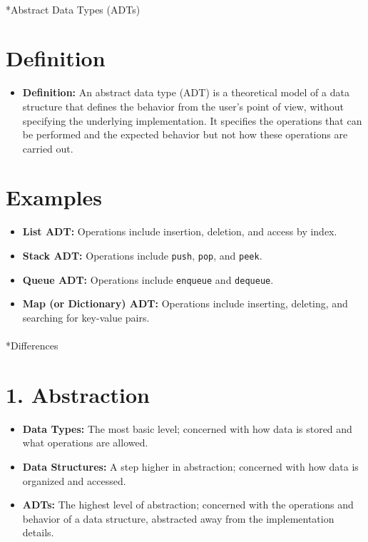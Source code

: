 \documentclass[
  letterpaper,
  DIV=11,
  numbers=noendperiod]{scrreprt}
\makeatletter
\let\oldparagraph\paragraph
\renewcommand{\paragraph}{
    \@ifstar
      \xxxParagraphStar
      \xxxParagraphNoStar
  }
\newcommand{\xxxParagraphStar}[1]{\oldparagraph*{#1}\mbox{}}
\newcommand{\xxxParagraphNoStar}[1]{\oldparagraph{#1}\mbox{}}
\providecommand{\tightlist}{%
  \setlength{\itemsep}{0pt}\setlength{\parskip}{0pt}}
\makeatother
\begin{document}
\paragraph*{Abstract Data Types (ADTs)}\label{abstract-data-types-adts}

\section{Definition}

\begin{itemize}
\tightlist
\item
  \textbf{Definition:} An abstract data type (ADT) is a theoretical
  model of a data structure that defines the behavior from the user's
  point of view, without specifying the underlying implementation. It
  specifies the operations that can be performed and the expected
  behavior but not how these operations are carried out.
\end{itemize}

\section{Examples}

\begin{itemize}
\tightlist
\item
  \textbf{List ADT:} Operations include insertion, deletion, and access
  by index.
\item
  \textbf{Stack ADT:} Operations include \texttt{push}, \texttt{pop},
  and \texttt{peek}.
\item
  \textbf{Queue ADT:} Operations include \texttt{enqueue} and
  \texttt{dequeue}.
\item
  \textbf{Map (or Dictionary) ADT:} Operations include inserting,
  deleting, and searching for key-value pairs.
\end{itemize}

\paragraph*{Differences}\label{differences}

\section{1. Abstraction}

\begin{itemize}
\tightlist
\item
  \textbf{Data Types:} The most basic level; concerned with how data is
  stored and what operations are allowed.
\item
  \textbf{Data Structures:} A step higher in abstraction; concerned with
  how data is organized and accessed.
\item
  \textbf{ADTs:} The highest level of abstraction; concerned with the
  operations and behavior of a data structure, abstracted away from the
  implementation details.
\end{itemize}
\end{document}
